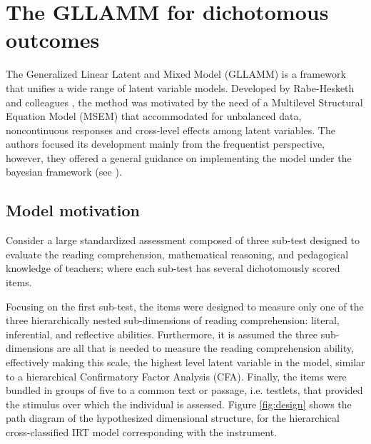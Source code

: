 \chapter{The GLLAMM for dichotomous outcomes} \label{chap:framework}

The Generalized Linear Latent and Mixed Model (GLLAMM) is a framework that unifies a wide range of latent variable models. Developed by Rabe-Hesketh and colleagues \cite{Rabe_et_al_2004a, Rabe_et_al_2004b, Rabe_et_al_2004c, Skrondal_et_al_2004a, Rabe_et_al_2012}, the method was motivated by the need of a Multilevel Structural Equation Model (MSEM) that accommodated for unbalanced data, noncontinuous responses and cross-level effects among latent variables. The authors focused its development mainly from the frequentist perspective, however, they offered a general guidance on implementing the model under the bayesian framework (see \citet{Skrondal_et_al_2004a}).


\section{Model motivation} \label{sect:motivation}

Consider a large standardized assessment composed of three sub-test designed to evaluate the reading comprehension, mathematical reasoning, and pedagogical knowledge of teachers; where each sub-test has several dichotomously scored items. 

Focusing on the first sub-test, the items were designed to measure only one of the three hierarchically nested sub-dimensions of reading comprehension: literal, inferential, and reflective abilities. Furthermore, it is assumed the three sub-dimensions are all that is needed to measure the reading comprehension ability, effectively making this scale, the highest level latent variable in the model, similar to a hierarchical Confirmatory Factor Analysis (CFA). Finally, the items were bundled in groups of five to a common text or passage, i.e. testlets, that provided the stimulus over which the individual is assessed. Figure \ref{fig:design} shows the path diagram of the hypothesized dimensional structure, for the hierarchical cross-classified IRT model corresponding with the instrument.

